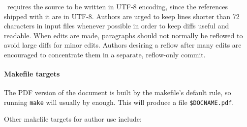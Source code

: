 \documentclass[11pt,a4paper]{ivoa}
\begin{document}
\ivoatex\ requires the source to be written in UTF-8 encoding, since the
references shipped with it are in UTF-8.
Authors are urged to keep lines shorter than 72 characters in input
files whenever possible in order to keep diffs useful and readable.
When edits are made, paragraphs should not normally be reflowed to avoid
large diffs for minor edits.  Authors desiring a reflow after many edits
are encouraged to concentrate them in a separate, reflow-only commit.

\paragraph{Makefile targets}

The PDF version of the document is built by the makefile's default rule,
so running \texttt{make} will usually by enough.  This will produce a
file \texttt{\$DOCNAME.pdf}.

Other makefile targets for author use include:
\end{document}
